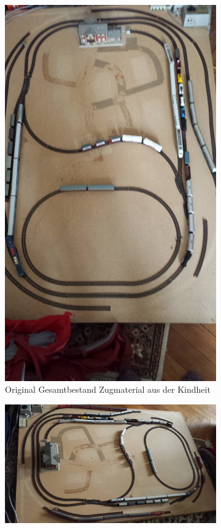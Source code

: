 \begin{figure}[h]
\begin{subfigure}[b]{0.49\textwidth}
    \includegraphics[width=1.0\textwidth]{img/elder_maps/train_material_childhood.jpg}
   \caption{Original Gesamtbestand Zugmaterial aus der Kindheit}
    \label{img:elder_maps_train_material_childhood}
    \end{subfigure}
		\begin{subfigure}[b]{0.49\textwidth}
    \includegraphics[width=1.0\textwidth]{img/elder_maps/train_material_kickoff.jpg}

\end{subfigure}
\end{figure}

